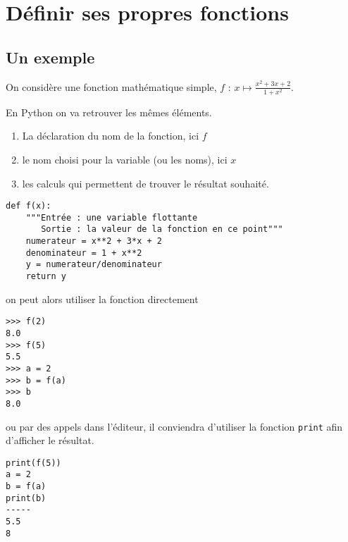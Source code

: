 \section{Définir ses propres fonctions}
\subsection{Un exemple}
On considère une fonction mathématique simple, $f$ :  $\displaystyle x \mapsto \frac{x^2+3x+2}{1+x^2}$.

En Python on va retrouver les mêmes éléments.
\begin{enumerate}
	\item La déclaration du nom de la fonction, ici $f$
	\item le nom choisi pour la variable (ou les noms), ici $x$
	\item les calculs qui permettent de trouver le résultat souhaité.
\end{enumerate}
\begin{lstlisting}
def f(x):
	"""Entrée : une variable flottante
	   Sortie : la valeur de la fonction en ce point"""
	numerateur = x**2 + 3*x + 2
	denominateur = 1 + x**2
	y = numerateur/denominateur
	return y
\end{lstlisting}
on peut alors utiliser la fonction directement
\begin{lstlisting}
>>> f(2)
8.0
>>> f(5)
5.5
>>> a = 2
>>> b = f(a)
>>> b
8.0
\end{lstlisting}
ou par des appels dans l'éditeur, il conviendra d'utiliser la fonction \texttt{print} afin d'afficher le résultat.
\begin{lstlisting}
print(f(5))
a = 2
b = f(a)
print(b)
-----
5.5
8
\end{lstlisting}
\newpage
